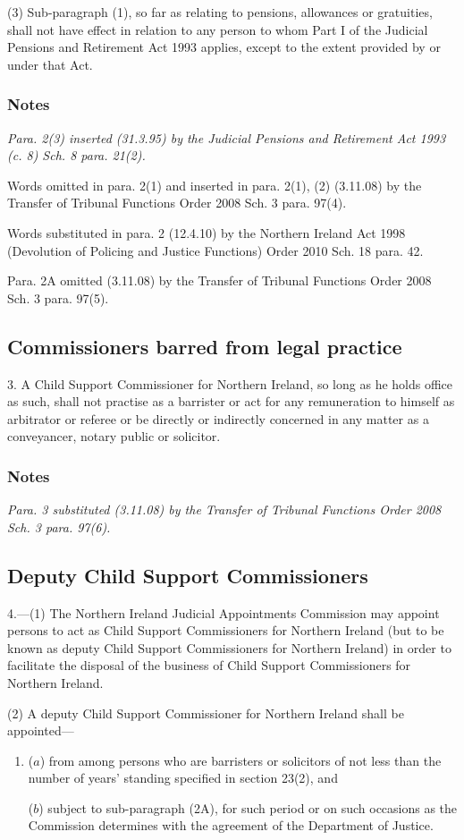 \documentclass[a4paper]{article}
\newcommand\amendment[1]{\subsubsection*{Notes}{\itshape\frenchspacing\footnotesize #1 \par}}
\begin{document}
(3) Sub-paragraph (1), so far as relating to pensions, allowances or gratuities, shall not have effect in relation to any person to whom Part I of the Judicial Pensions and Retirement Act 1993 applies, except to the extent provided by or under that Act.

\amendment{
Para. 2(3) inserted (31.3.95) by the Judicial Pensions and Retirement Act 1993 (c. 8) Sch. 8 para. 21(2).

Words omitted in para. 2(1) and inserted in para. 2(1), (2) (3.11.08) by the Transfer of Tribunal Functions Order 2008  Sch. 3 para. 97(4).

Words substituted in para. 2 (12.4.10) by the Northern Ireland Act 1998 (Devolution of Policing and Justice Functions) Order 2010 Sch. 18 para. 42.

\medskip

Para. 2A omitted (3.11.08) by the Transfer of Tribunal Functions Order 2008  Sch. 3 para. 97(5).

}

\subsection*{Commissioners barred from legal practice}

3. A Child Support Commissioner for Northern Ireland, so long as he holds office as such, shall not practise as a barrister or act for any remuneration to himself as arbitrator or referee or be directly or indirectly concerned in any matter as a conveyancer, notary public or solicitor.

\amendment{
Para. 3 substituted (3.11.08) by the Transfer of Tribunal Functions Order 2008  Sch. 3 para. 97(6).
}

\subsection*{Deputy Child Support Commissioners}

4.—(1) The Northern Ireland Judicial Appointments Commission may appoint persons to act as Child Support Commissioners for Northern Ireland (but to be known as deputy Child Support Commissioners for Northern Ireland) in order to facilitate the disposal of the business of Child Support Commissioners for Northern Ireland.

(2) A deputy Child Support Commissioner for Northern Ireland shall be appointed---
\begin{enumerate}\item[]
($a$) from among persons who are barristers or solicitors of not less than the number
of years’ standing specified in section 23(2), and

($b$) subject to sub-paragraph (2A), for such period or on such occasions as
the Commission determines with the agreement of the Department of Justice.
\end{enumerate}
\end{document}
